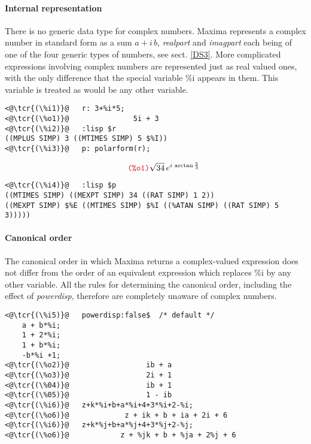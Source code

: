 \documentclass[../Maxima_Workbook.tex]{subfiles}
\begin{document}
\paragraph{Internal representation} \mbox{}

\lz There is no generic data type for complex numbers. Maxima represents a complex number in standard form as a sum $ a + i \, b $, \emph{realpart} and \emph{imagpart} each being of one of the four generic types of numbers, see sect. \ref{DS3}. More complicated expressions involving complex numbers are represented just as real valued ones, with the only difference that the special variable \%i appears in them. This variable is treated as would be any other variable.

\lz \begin{small}
\color{blue} \leqn
\begin{lstlisting}
<@\tcr{(\%i1)}@   r: 3+%i*5;
<@\tcr{(\%o1)}@			      5i + 3
<@\tcr{(\%i2)}@   :lisp $r
((MPLUS SIMP) 3 ((MTIMES SIMP) 5 $%I))
<@\tcr{(\%i3)}@   p: polarform(r);
\end{lstlisting}
\vspace{-4mm} \[\tag*{\tcr{\ttfamily (\%o1)}} \sqrt{34} \, e^{i \, \arctan \frac{5}{3}} \]
\vspace{-6mm} \begin{lstlisting}
<@\tcr{(\%i4)}@   :lisp $p
((MTIMES SIMP) ((MEXPT SIMP) 34 ((RAT SIMP) 1 2))
((MEXPT SIMP) $%E ((MTIMES SIMP) $%I ((%ATAN SIMP) ((RAT SIMP) 5 3)))))
\end{lstlisting}
\color{black} \reqn
\end{small} \vspace{-2mm} 

\paragraph{Canonical order} \mbox{}

\lz The canonical order in which Maxima returns a complex-valued expression does not differ from the order of an equivalent expression which replaces \%i by any other variable. All the rules for determining the canonical order, including the effect of \emph{powerdisp}, therefore are completely unaware of complex numbers.

\begin{lstlisting}
<@\tcr{(\%i5)}@   powerdisp:false$  /* default */
	a + b*%i;
	1 + 2*%i;
	1 + b*%i;
	-b*%i +1;
<@\tcr{(\%o2)}@  			     ib + a
<@\tcr{(\%o3)}@  			     2i + 1
<@\tcr{(\%04)}@  			     ib + 1
<@\tcr{(\%05)}@  			     1 - ib
<@\tcr{(\%i6)}@   z+k*%i+b+a*%i+4+3*%i+2-%i;
<@\tcr{(\%o6)}@   		    z + ik + b + ia + 2i + 6
<@\tcr{(\%i6)}@   z+k*%j+b+a*%j+4+3*%j+2-%j;
<@\tcr{(\%o6)}@   	   	   z + %jk + b + %ja + 2%j + 6
\end{lstlisting}
\end{document}
